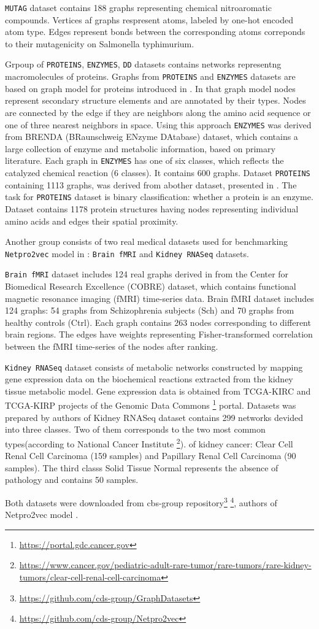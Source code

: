 \texttt{MUTAG} dataset \cite{MUTAG} contains 188 graphs representing chemical nitroaromatic compounds.
Vertices af graphs respresent atoms, labeled by one-hot encoded atom type.
Edges represent bonds between the corresponding atoms correponds to their mutagenicity on Salmonella typhimurium.

Grpoup of \texttt{PROTEINS}, \texttt{ENZYMES}, \texttt{DD} datasets contains networks
representng macromolecules of proteins. Graphs from \texttt{PROTEINS} and \texttt{ENZYMES} datasets
are based on  graph model for proteins introduced in \cite{ProteinBased}.
In that graph model nodes represent secondary structure elements and are annotated by their types.
Nodes are connected by the edge if they are neighbors along the amino acid sequence or one of three nearest neighbors in
space. Using this approach \texttt{ENZYMES} was derived from BRENDA (BRaunschweig ENzyme DAtabase)\cite{Brenda} dataset, which
contains a large collection of enzyme and metabolic information, based on primary literature. Each graph in \texttt{ENZYMES}
has one of six classes, which reflects the catalyzed chemical reaction (6 classes). It contains 600 graphs. Dataset \texttt{PROTEINS} containing
1113 graphs, was derived  from abother dataset, presented in \cite{ProtBase2}. The task for \texttt{PROTEINS} dataset is binary classification:
whether a protein is an enzyme. Dataset \cite{DD} contains 1178 protein structures having nodes representing
individual amino acids and edges their spatial proximity.

Another group consists of two real medical datasets used for benchmarking \texttt{Netpro2vec} model in \cite{Netpro2vec}: \texttt{Brain fMRI} and
\texttt{Kidney RNASeq} datasets.

\texttt{Brain fMRI} dataset includes 124 real graphs derived in \cite{BrainFmri} from the Center for Biomedical Research Excellence (COBRE) dataset, which contains
functional magnetic resonance imaging (fMRI) time-series data. Brain fMRI dataset includes 124 graphs: 54 graphs from Schizophrenia subjects (Sch) and 70 graphs from
healthy controls (Ctrl). Each graph contains 263 nodes corresponding to different brain regions. The edges have weights representing Fisher-transformed correlation between
the fMRI time-series of the nodes after ranking.

\texttt{Kidney RNASeq} dataset consists of metabolic networks constructed by mapping gene expression data on the biochemical reactions
extracted from the kidney tissue metabolic model. Gene expression data is obtained from TCGA-KIRC and TCGA-KIRP projects
of the Genomic Data Commons \footnote{\url{https://portal.gdc.cancer.gov}} portal. Datasets was prepared by authors of \cite{Netpro2vec}
Kidney RNASeq dataset contains 299 networks devided into three classes. Two of them corresponds to the two most common types(according to National Cancer Institute \footnote{\url{https://www.cancer.gov/pediatric-adult-rare-tumor/rare-tumors/rare-kidney-tumors/clear-cell-renal-cell-carcinoma}}).
of kidney cancer: Clear Cell Renal Cell Carcinoma (159 samples) and Papillary Renal Cell Carcinoma (90 samples). The third classs Solid Tissue Normal represents the absence of pathology
and contains 50 samples.

Both datasets were downloaded from cbs-group repository\footnote{\url{https://github.com/cds-group/GraphDatasets}} \footnote{\url{https://github.com/cds-group/Netpro2vec}}, authors of Netpro2vec model \cite{Netpro2vec}.
